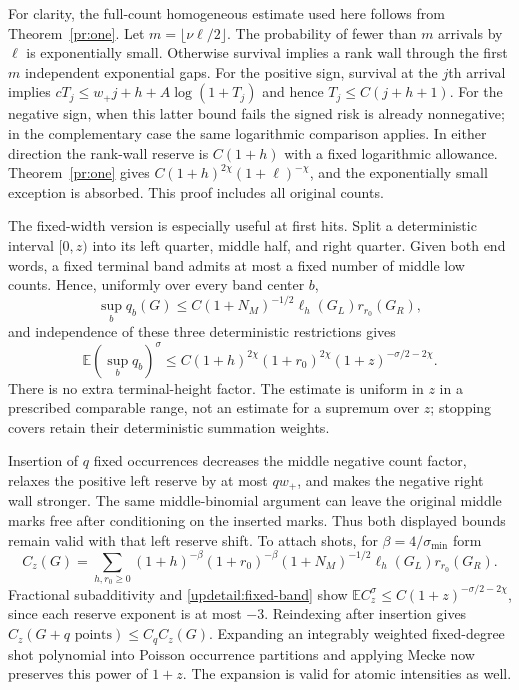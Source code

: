 For clarity, the full-count homogeneous estimate used here follows
from Theorem~\ref{pr:one}. Let $m=\lfloor\nu\ell/2\rfloor$.
The probability of fewer than $m$ arrivals by $\ell$ is exponentially
small. Otherwise survival implies a rank wall through the first $m$
independent exponential gaps. For the positive sign, survival at the
$j$th arrival implies
$cT_j\leq w_+j+h+A\log(1+T_j)$ and hence
$T_j\leq C(j+h+1)$. For the negative sign, when this latter bound
fails the signed risk is already nonnegative; in the complementary
case the same logarithmic comparison applies. In either direction
the rank-wall reserve is $C(1+h)$ with a fixed logarithmic allowance.
Theorem~\ref{pr:one} gives
$C(1+h)^{2\chi}(1+\ell)^{-\chi}$, and the exponentially small
exception is absorbed. This proof includes all original counts.

The fixed-width version is especially useful at first hits. Split
a deterministic interval $[0,z)$ into its left quarter, middle half,
and right quarter. Given both end words, a fixed terminal band admits
at most a fixed number of middle low counts. Hence, uniformly over
every band center $b$,
\[
 \sup_b q_b(G)\leq C(1+N_M)^{-1/2}\ell_h(G_L)r_{r_0}(G_R),
\]
and independence of these three deterministic restrictions gives
\begin{equation}
 \mathbb E(\sup_bq_b)^\sigma
 \leq C(1+h)^{2\chi}(1+r_0)^{2\chi}
                   (1+z)^{-\sigma/2-2\chi}.
 \label{updetail:fixed-band}
\end{equation}
There is no extra terminal-height factor. The estimate is uniform in
$z$ in a prescribed comparable range, not an estimate for a supremum
over $z$; stopping covers retain their deterministic summation weights.

Insertion of $q$ fixed occurrences decreases the middle negative
count factor, relaxes the positive left reserve by at most $qw_+$,
and makes the negative right wall stronger. The same middle-binomial
argument can leave the original middle marks free after conditioning
on the inserted marks. Thus both displayed bounds remain valid with
that left reserve shift. To attach shots, for
$\beta=4/\sigma_{\min}$ form
\[
 C_z(G)=\sum_{h,r_0\geq0}
 (1+h)^{-\beta}(1+r_0)^{-\beta}
 (1+N_M)^{-1/2}\ell_h(G_L)r_{r_0}(G_R).
\]
Fractional subadditivity and \eqref{updetail:fixed-band} show
$\mathbb EC_z^\sigma\leq C(1+z)^{-\sigma/2-2\chi}$, since each
reserve exponent is at most $-3$. Reindexing after insertion gives
$C_z(G+q\text{ points})\leq C_q C_z(G)$.
Expanding an integrably weighted fixed-degree shot polynomial into
Poisson occurrence partitions and applying Mecke now preserves this
power of $1+z$. The expansion is valid for atomic intensities as well.

